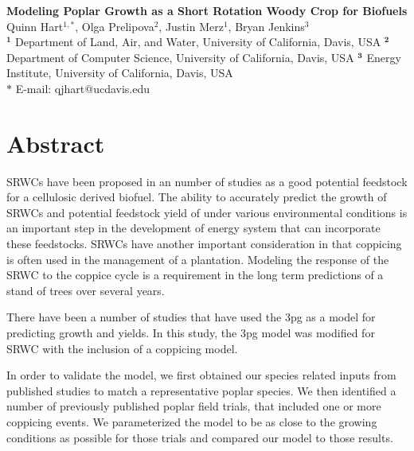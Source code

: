 \documentclass[10pt]{article}
\date{}
\begin{document}
\begin{flushleft}
{\Large
\textbf{Modeling Poplar Growth as a Short Rotation Woody Crop for Biofuels}
}
\\
Quinn Hart$^{1,\ast}$,
Olga Prelipova$^{2}$,
Justin Merz$^{1}$,
Bryan Jenkins$^{3}$
\\
$^{\textbf{1}}$ Department of Land, Air, and Water, University of California, Davis, USA
$^{\textbf{2}}$ Department of Computer Science, University of California, Davis, USA
$^{\textbf{3}}$ Energy Institute, University of California, Davis, USA
\\
$\ast$ E-mail: qjhart@ucdavis.edu
\end{flushleft}

\section*{Abstract}

\acp{SRWC} have been proposed in an number of studies as a good
potential feedstock for a cellulosic derived biofuel.  The ability to
accurately predict the growth of \acp{SRWC} and potential feedstock
yield of under various environmental conditions is an important step
in the development of energy system that can incorporate these
feedstocks.  \acp{SRWC} have another important consideration in that
coppicing is often used in the management of a plantation.  Modeling
the response of the \ac{SRWC} to the coppice cycle is a requirement in
the long term predictions of a stand of trees over several years.

There have been a number of studies that have used the \ac{3pg} as a
model for predicting growth and yields.  In this study, the \acf{3pg}
model was modified for \ac{SRWC} with the inclusion of a coppicing
model.

In order to validate the model, we first obtained our species related
inputs from published studies to match a representative poplar
species.  We then identified a number of previously published poplar
field trials, that included one or more coppicing events.  We
parameterized the model to be as close to the growing conditions as
possible for those trials and compared our model to those results.
 
\end{document}
